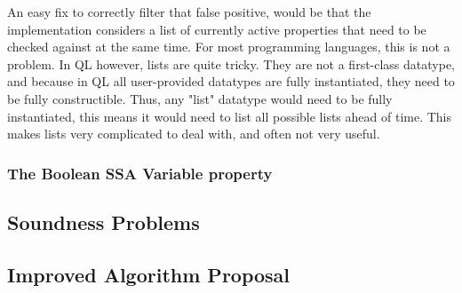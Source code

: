 An easy fix to correctly filter that false positive,
would be that the implementation considers a list of currently active
properties that need to be checked against at the same time.
For most programming languages, this is not a problem.
In QL however, lists are quite tricky.
They are not a first-class datatype, and because in QL all user-provided datatypes 
are fully instantiated, they need to be fully constructible.
Thus, any "list" datatype would need to be fully instantiated, this means it would
need to list all possible lists ahead of time.
This makes lists very complicated to deal with, and often not very useful.

\subsubsection*{The Boolean SSA Variable property}



\subsection{Soundness Problems}
\subsection{Improved Algorithm Proposal}


